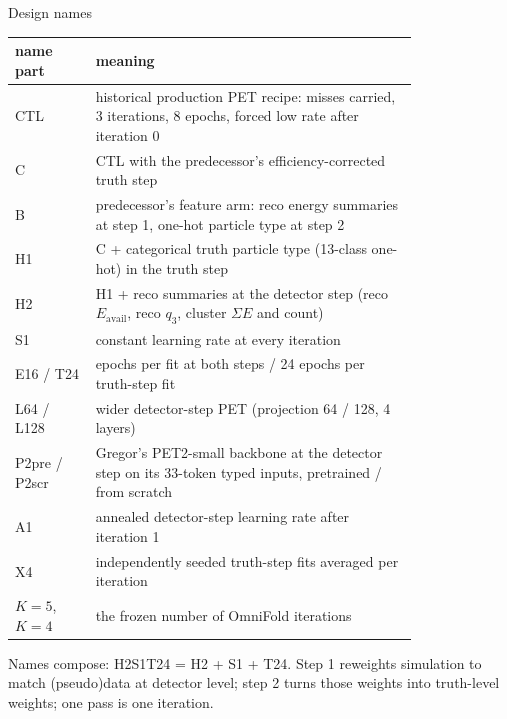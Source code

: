 \documentclass[aspectratio=169,10pt]{beamer}
\def\evidencetext{}
\begin{document}
\gdef\evidencetext{\texttt{DEVELOPMENT-20260926.md}; \texttt{PROTOCOL-20260925.md (5)}}
\begin{frame}{Design names}
{\scriptsize
\begin{tabular}{l>{\raggedright\arraybackslash}p{0.80\linewidth}}
\toprule
name part & meaning \\
\midrule
CTL & historical production PET recipe: misses carried, 3 iterations, 8 epochs, forced low rate after iteration 0 \\
C & CTL with the predecessor's efficiency-corrected truth step \\
B & predecessor's feature arm: reco energy summaries at step 1, one-hot particle type at step 2 \\
H1 & C + categorical truth particle type (13-class one-hot) in the truth step \\
H2 & H1 + reco summaries at the detector step (reco $E_\mathrm{avail}$, reco $q_3$, cluster $\Sigma E$ and count) \\
S1 & constant learning rate at every iteration \\
E16 / T24 & 16 epochs per fit at both steps / 24 epochs per truth-step fit \\
L64 / L128 & wider detector-step PET (projection 64 / 128, 4 layers) \\
P2pre / P2scr & Gregor's PET2-small backbone at the detector step on its 33-token typed inputs, pretrained / from scratch \\
A1 & annealed detector-step learning rate after iteration 1 \\
X4 & 4 independently seeded truth-step fits averaged per iteration \\
$K{=}5$, $K{=}4$ & the frozen number of OmniFold iterations \\
\bottomrule
\end{tabular}}\par\vspace{0.1cm}\scriptsize Names compose: H2S1T24 = H2 + S1 + T24. Step 1 reweights simulation to match (pseudo)data at detector level; step 2 turns those weights into truth-level weights; one pass is one iteration.
\end{frame}
\end{document}
